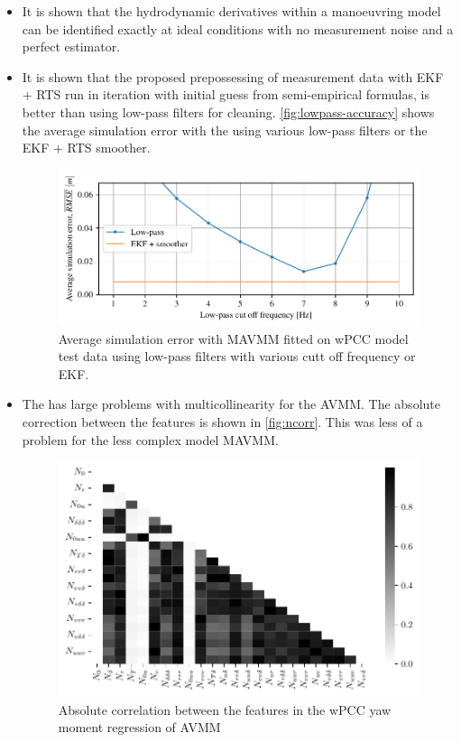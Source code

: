 \begin{itemize}
    
    \item It is shown that the hydrodynamic derivatives within a manoeuvring model can be identified exactly at ideal conditions with no measurement noise and a perfect estimator.
    
    \item It is shown that the proposed prepossessing of measurement data with EKF + RTS run in iteration with initial guess from semi-empirical formulas, is better than using low-pass filters for cleaning. \autoref{fig:lowpass-accuracy} shows the average simulation error with the  using various low-pass filters or the EKF + RTS smoother.
    \begin{figure}[!htb]
        \centering
        \includegraphics{kappa/images/6.pdf}
        \caption{Average simulation error with MAVMM fitted on wPCC model test data using low-pass filters with various cutt off frequency or EKF.}
        \label{fig:lowpass-accuracy}
    \end{figure}
    
    \item The  has large problems with multicollinearity for the AVMM. The absolute correction between the features is shown in \autoref{fig:ncorr}. This was less of a problem for the less complex model MAVMM.
    \begin{figure}[!htb]
        \centering
        \includegraphics{kappa/images/9.pdf}
        \caption{Absolute correlation between the features in the wPCC yaw moment regression of AVMM}
        \label{fig:ncorr}
    \end{figure}
    

\end{itemize}

